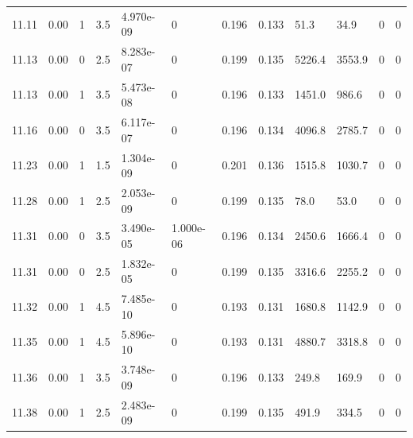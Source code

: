 \documentclass[preview]{standalone}
\begin{document}
{{{{{{{{{{{\begin{tabular}{L{1.2cm}C{1.2cm} C{0.3cm}C{0.5cm} C{1.4cm}C{1.4cm} C{1.4cm}C{1.4cm} C{1.6cm}C{1.6cm} C{1.6cm}C{1.6cm}}
  11.11  &  0.00  & 1     & 3.5 &  4.970e-09  & 0  &  0.196&   0.133& 51.3 & 34.9   &  0 & 0  \\ 
  11.13  &  0.00  & 0     & 2.5 &  8.283e-07  & 0  &  0.199&   0.135& 5226.4 & 3553.9   &  0 & 0  \\ 
  11.13  &  0.00  & 1     & 3.5 &  5.473e-08  & 0  &  0.196&   0.133& 1451.0 & 986.6   &  0 & 0  \\ 
  11.16  &  0.00  & 0     & 3.5 &  6.117e-07  & 0  &  0.196&   0.134& 4096.8 & 2785.7   &  0 & 0  \\ 
  11.23  &  0.00  & 1     & 1.5 &  1.304e-09  & 0  &  0.201&   0.136& 1515.8 & 1030.7   &  0 & 0  \\ 
  11.28  &  0.00  & 1     & 2.5 &  2.053e-09  & 0  &  0.199&   0.135& 78.0 & 53.0   &  0 & 0  \\ 
  11.31  &  0.00  & 0     & 3.5 &  3.490e-05  & 1.000e-06  &  0.196&   0.134& 2450.6 & 1666.4   &  0 & 0  \\ 
  11.31  &  0.00  & 0     & 2.5 &  1.832e-05  & 0  &  0.199&   0.135& 3316.6 & 2255.2   &  0 & 0  \\ 
  11.32  &  0.00  & 1     & 4.5 &  7.485e-10  & 0  &  0.193&   0.131& 1680.8 & 1142.9   &  0 & 0  \\ 
  11.35  &  0.00  & 1     & 4.5 &  5.896e-10  & 0  &  0.193&   0.131& 4880.7 & 3318.8   &  0 & 0  \\ 
  11.36  &  0.00  & 1     & 3.5 &  3.748e-09  & 0  &  0.196&   0.133& 249.8 & 169.9   &  0 & 0  \\ 
  11.38  &  0.00  & 1     & 2.5 &  2.483e-09  & 0  &  0.199&   0.135& 491.9 & 334.5   &  0 & 0  \\ 
\hline 
\end{tabular} 

}}}}}}}}}}}
\end{document}
